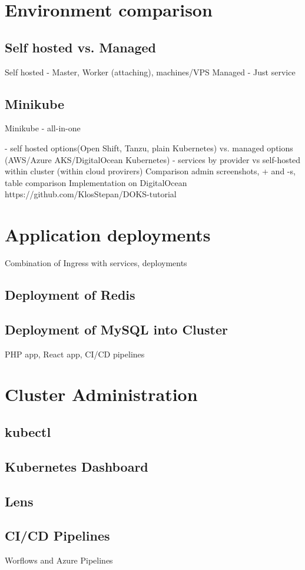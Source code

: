 \documentclass{article}
\begin{document}
\section{Environment comparison}
\subsection{Self hosted vs. Managed}
Self hosted - Master, Worker (attaching), machines/VPS
Managed - Just service
\subsection{Minikube}
Minikube - all-in-one

- self hosted options(Open Shift, Tanzu, plain Kubernetes) vs. managed options (AWS/Azure AKS/DigitalOcean Kubernetes)
- services by provider vs self-hosted within cluster (within cloud provirers)
Comparison admin screenshots, + and -s, table comparison
Implementation on DigitalOcean https://github.com/KlosStepan/DOKS-tutorial
\section{Application deployments}
Combination of Ingress with services, deployments
\subsection{Deployment of Redis}
\subsection{Deployment of MySQL into Cluster}
PHP app, React app, CI/CD pipelines
\section{Cluster Administration}
\subsection{kubectl}
\subsection{Kubernetes Dashboard}
\subsection{Lens}
\subsection{CI/CD Pipelines}
Worflows and Azure Pipelines
\end{document}
